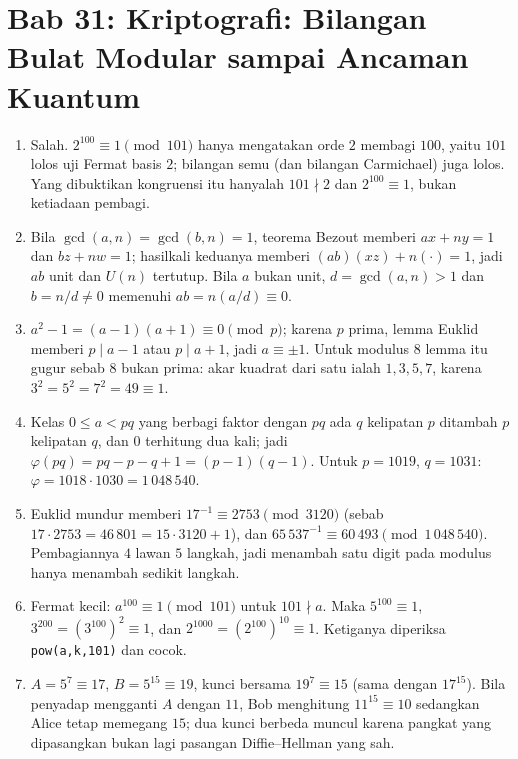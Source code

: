 \section*{Bab 31: Kriptografi: Bilangan Bulat Modular sampai Ancaman Kuantum}
\begin{enumerate}[label=\textbf{31.\arabic*}]
  \item Salah. $2^{100}\equiv1\pmod{101}$ hanya mengatakan orde $2$ membagi $100$,
        yaitu $101$ lolos uji Fermat basis $2$; bilangan semu (dan bilangan
        Carmichael) juga lolos. Yang dibuktikan kongruensi itu hanyalah $101\nmid2$
        dan $2^{100}\equiv1$, bukan ketiadaan pembagi.

  \item Bila $\gcd(a,n)=\gcd(b,n)=1$, teorema Bezout memberi $ax+ny=1$ dan
        $bz+nw=1$; hasilkali keduanya memberi $(ab)(xz)+n(\cdot)=1$, jadi $ab$ unit
        dan $U(n)$ tertutup. Bila $a$ bukan unit, $d=\gcd(a,n)>1$ dan
        $b=n/d\ne0$ memenuhi $ab=n(a/d)\equiv0$.

  \item $a^{2}-1=(a-1)(a+1)\equiv0\pmod p$; karena $p$ prima, lemma Euklid memberi
        $p\mid a-1$ atau $p\mid a+1$, jadi $a\equiv\pm1$. Untuk modulus $8$ lemma itu
        gugur sebab $8$ bukan prima: akar kuadrat dari satu ialah $1,3,5,7$, karena
        $3^{2}=5^{2}=7^{2}=49\equiv1$.

  \item Kelas $0\le a<pq$ yang berbagi faktor dengan $pq$ ada $q$ kelipatan $p$
        ditambah $p$ kelipatan $q$, dan $0$ terhitung dua kali; jadi
        $\varphi(pq)=pq-p-q+1=(p-1)(q-1)$. Untuk $p=1019$, $q=1031$:
        $\varphi=1018\cdot1030=1\,048\,540$.

  \item Euklid mundur memberi $17^{-1}\equiv2753\pmod{3120}$ (sebab
        $17\cdot2753=46\,801=15\cdot3120+1$), dan
        $65\,537^{-1}\equiv60\,493\pmod{1\,048\,540}$. Pembagiannya $4$ lawan $5$
        langkah, jadi menambah satu digit pada modulus hanya menambah sedikit
        langkah.

  \item Fermat kecil: $a^{100}\equiv1\pmod{101}$ untuk $101\nmid a$. Maka
        $5^{100}\equiv1$, $3^{200}=(3^{100})^{2}\equiv1$, dan
        $2^{1000}=(2^{100})^{10}\equiv1$. Ketiganya diperiksa
        \texttt{pow(a,k,101)} dan cocok.

  \item $A=5^{7}\equiv17$, $B=5^{15}\equiv19$, kunci bersama $19^{7}\equiv15$
        (sama dengan $17^{15}$). Bila penyadap mengganti $A$ dengan $11$, Bob
        menghitung $11^{15}\equiv10$ sedangkan Alice tetap memegang $15$; dua kunci
        berbeda muncul karena pangkat yang dipasangkan bukan lagi pasangan
        Diffie--Hellman yang sah.


\end{enumerate}
